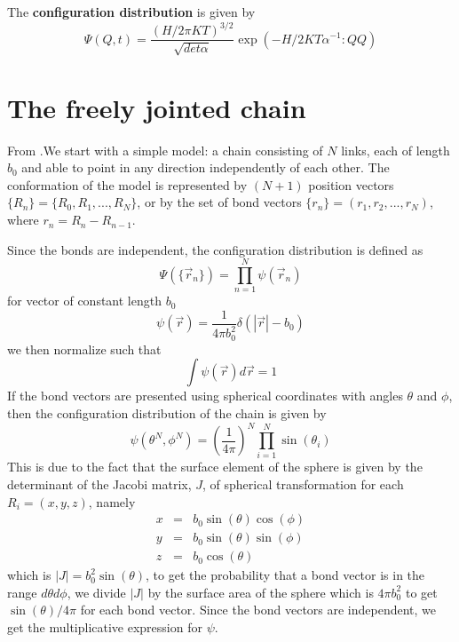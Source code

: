 \documentclass{report}
\begin{document}
The \textbf{configuration distribution} is given by 
\begin{equation*}
\Psi(Q,t)=\frac{(H/2\pi KT)^{3/2}}{\sqrt{det\alpha}}\exp(-H/2KT \alpha^{-1}:QQ)
\end{equation*}

\section{The freely jointed chain}\label{section_theFreelyJointedChain}
From \cite{doi1986theory}.We start with a simple model: a chain consisting of $N$ links, each of length $b_0$ and able to point in any direction independently of each other. The conformation of the model is represented by $(N+1)$ position vectors $\{R_n\}=\{R_0,R_1,...,R_{N}\}$, or by the set of bond vectors $\{r_n\}=(r_1,r_2,...,r_N)$, where $r_n=R_{n}-R_{n-1}$. 

Since the bonds are independent, the configuration distribution is defined as 
\begin{equation*} 
\Psi(\{\vec{r}_n\})=\prod_{n=1}^N\psi(\vec{r}_n)
\end{equation*}
for vector of constant length $b_0$
\begin{equation*}
\psi(\vec{r})=\frac{1}{4\pi b_0^2}\delta(|\vec{r}|-b_0)
\end{equation*}
we then normalize such that 
\begin{equation*}
\int \psi(\vec{r})d\vec{r} =1
\end{equation*}
If the bond vectors are presented using spherical coordinates with angles $\theta$ and $\phi$, then the configuration distribution of the chain is given by 
\begin{equation*}
\psi(\theta^{N},\phi^{N})=\left(\frac{1}{4\pi}\right)^{N} \prod_{i=1}^{N}\sin(\theta_i)
\end{equation*}
This is due to the fact that the surface element of the sphere is given by the determinant of the Jacobi matrix, $J$, of spherical transformation for each $R_i=(x,y,z)$, namely
\begin{eqnarray*}
x &=& b_0\sin(\theta)\cos(\phi)\\
y &=& b_0\sin(\theta)\sin(\phi)\\
z &=& b_0\cos(\theta) 
\end{eqnarray*} 
which is $|J|=b_0^2\sin(\theta)$, to get the probability that a bond vector is in the range $d\theta d\phi$, we divide $|J|$ by the surface area of the sphere which is $4\pi b_0^2$ to get $\sin(\theta)/4\pi$ for each bond vector. Since the bond vectors are independent, we get the multiplicative expression for $\psi$.
 
\end{document}
